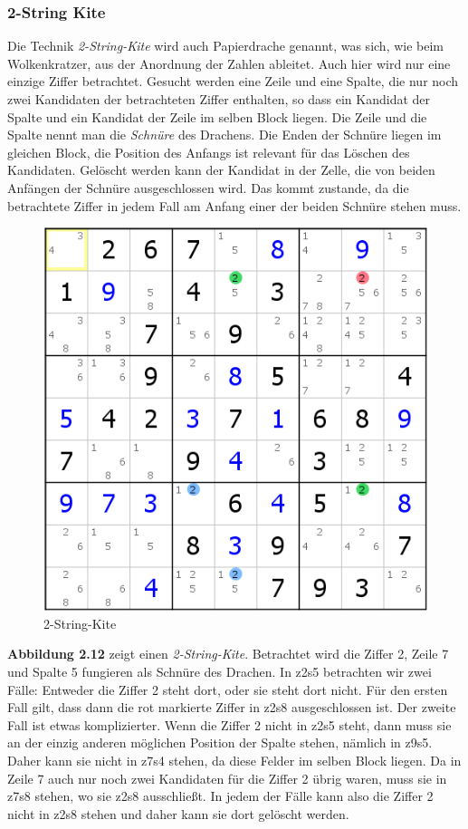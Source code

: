 \newpage
\subsubsection{2-String Kite}
Die Technik \textit{2-String-Kite} wird auch Papierdrache genannt, was sich, wie beim Wolkenkratzer, aus der Anordnung der Zahlen ableitet. Auch hier wird nur eine einzige Ziffer betrachtet. Gesucht werden eine Zeile und eine Spalte, die nur noch zwei Kandidaten der betrachteten Ziffer enthalten, so dass ein Kandidat der Spalte und ein Kandidat der Zeile im selben Block liegen. Die Zeile und die Spalte nennt man die \textit{Schnüre} des Drachens. Die Enden der Schnüre liegen im gleichen Block, die Position des Anfangs ist relevant für das Löschen des Kandidaten. Gelöscht werden kann der Kandidat in der Zelle, die von beiden Anfängen der Schnüre ausgeschlossen wird. Das kommt zustande, da die betrachtete Ziffer in jedem Fall am Anfang einer der beiden Schnüre stehen muss.

\begin{figure}[h]
\begin{center}
\includegraphics{./img/2stringkite.png}
\caption{2-String-Kite}
\end{center}
\end{figure}

\noindent \textbf{Abbildung 2.12} zeigt einen \textit{2-String-Kite}. Betrachtet wird die Ziffer 2, Zeile 7 und Spalte 5 fungieren als Schnüre des Drachen. In z2s5 betrachten wir zwei Fälle: Entweder die Ziffer 2 steht dort, oder sie steht dort nicht. Für den ersten Fall gilt, dass dann die rot markierte Ziffer in z2s8 ausgeschlossen ist. Der zweite Fall ist etwas komplizierter. Wenn die Ziffer 2 nicht in z2s5 steht, dann muss sie an der einzig anderen möglichen Position der Spalte stehen, nämlich in z9s5. Daher kann sie nicht in z7s4 stehen, da diese Felder im selben Block liegen. Da in Zeile 7 auch nur noch zwei Kandidaten für die Ziffer 2 übrig waren, muss sie in z7s8 stehen, wo sie z2s8 ausschließt. In jedem der Fälle kann also die Ziffer 2 nicht in z2s8 stehen und daher kann sie dort gelöscht werden.